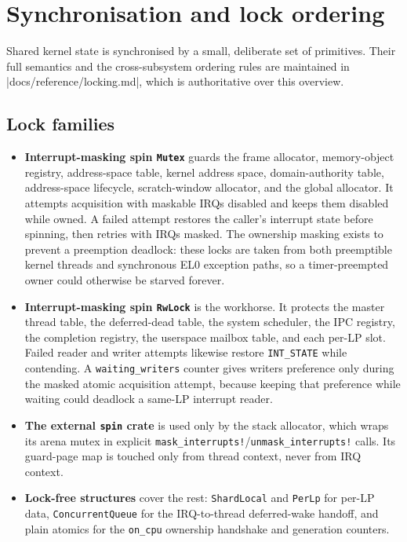 \section{Synchronisation and lock ordering}

Shared kernel state is synchronised by a small, deliberate set of primitives.
Their full semantics and the cross-subsystem ordering rules are maintained in
\repofile|docs/reference/locking.md|, which is authoritative over this
overview.

\subsection{Lock families}

\begin{itemize}
    \item \textbf{Interrupt-masking spin \texttt{Mutex}} guards the frame
        allocator, memory-object registry, address-space table, kernel address
        space, domain-authority table, address-space lifecycle, scratch-window
        allocator, and the global allocator. It attempts acquisition with
        maskable IRQs disabled and keeps them disabled while owned. A failed
        attempt restores the caller's interrupt state before spinning, then
        retries with IRQs masked. The ownership masking exists to prevent a
        preemption deadlock: these locks are taken from both preemptible kernel
        threads and synchronous EL0 exception paths, so a timer-preempted owner
        could otherwise be starved forever.

    \item \textbf{Interrupt-masking spin \texttt{RwLock}} is the workhorse. It
        protects the master thread table, the deferred-dead table, the system
        scheduler, the IPC registry, the completion registry, the userspace
        mailbox table, and each per-LP slot. Failed reader and writer attempts
        likewise restore \texttt{INT\_STATE} while contending. A
        \texttt{waiting\_writers} counter gives writers preference only during
        the masked atomic acquisition attempt, because keeping that preference while
        waiting could deadlock a same-LP interrupt reader.

    \item \textbf{The external \texttt{spin} crate} is used only by the stack
        allocator, which wraps its arena mutex in explicit
        \texttt{mask\_interrupts!}/\texttt{unmask\_interrupts!} calls. Its
        guard-page map is touched only from thread context, never from IRQ
        context.

    \item \textbf{Lock-free structures} cover the rest: \texttt{ShardLocal} and
        \texttt{PerLp} for per-LP data, \texttt{ConcurrentQueue} for the
        IRQ-to-thread deferred-wake handoff, and plain atomics for the
        \texttt{on\_cpu} ownership handshake and generation counters.
\end{itemize}

